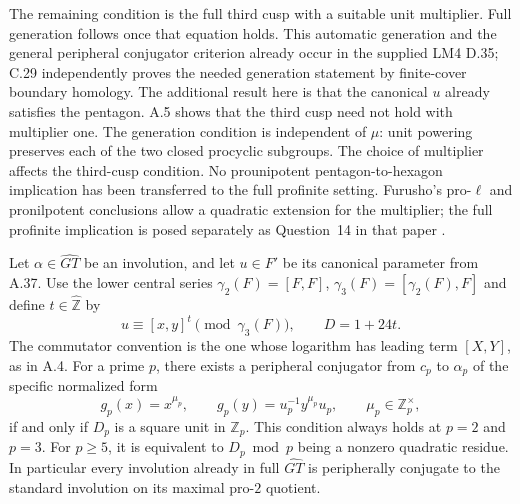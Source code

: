 The remaining condition is the full third cusp
with a suitable unit multiplier. Full generation
follows once that equation holds. This automatic
generation and the general peripheral conjugator
criterion already occur in the supplied LM4 D.35;
C.29 independently proves the needed generation
statement by finite-cover boundary homology. The
additional result here is that the canonical \(u\)
already satisfies the pentagon. A.5 shows that the
third cusp need not hold with multiplier one.
The generation condition is independent of \(\mu\):
unit powering preserves each of the two closed
procyclic subgroups. The choice of multiplier
affects the third-cusp condition.
No prounipotent pentagon-to-hexagon implication
has been transferred to the full profinite setting.
Furusho's pro-$\ell$ and pronilpotent conclusions
allow a quadratic extension for the multiplier;
the full profinite implication is posed separately
as Question~14 in that paper
\cite[\S3, Corollaries 12--13 and Question 14]{Furusho2010}.

Let \(\alpha\in\widehat{GT}\) be an involution, and let
\(u\in F'\) be its canonical parameter from A.37.
Use the lower central series
\(\gamma_2(F)=[F,F]\), \(\gamma_3(F)=[\gamma_2(F),F]\)
and define \(t\in\widehat{\mathbb Z}\) by
\[
              u\equiv[x,y]^t\pmod{\gamma_3(F)},
              \qquad D=1+24t.
 \tag{A.38.1}
\]
The commutator convention is the one whose logarithm
has leading term \([X,Y]\), as in A.4.
For a prime \(p\), there exists a peripheral
conjugator from \(c_p\) to \(\alpha_p\) of the
specific normalized form
\[
 g_p(x)=x^{\mu_p},\qquad
 g_p(y)=u_p^{-1}y^{\mu_p}u_p,
 \qquad \mu_p\in\mathbb Z_p^{\times},
 \tag{A.38.2}
\]
if and only if \(D_p\) is a square unit in
\(\mathbb Z_p\). This condition always holds at
\(p=2\) and \(p=3\). For \(p\geq5\), it is equivalent
to \(D_p\bmod p\) being a nonzero quadratic residue.
In particular every involution already in full
\(\widehat{GT}\) is peripherally conjugate to the
standard involution on its maximal pro-\(2\) quotient.

